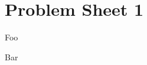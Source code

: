 \section*{Problem Sheet 1}
\setcounter{PS}{1}

\begin{boxproblem}
    Foo
\end{boxproblem}
\begin{solution}
    Bar
\end{solution}